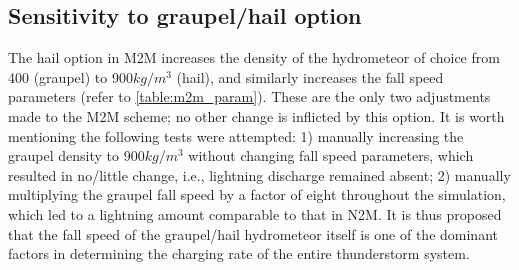\subsection{Sensitivity to graupel/hail option}
The hail option in M2M increases the density of the hydrometeor of choice from 400 (graupel) to 900$kg/m^3$ (hail), and similarly increases the fall speed parameters (refer to \ref{table:m2m_param}). These are the only two adjustments made to the M2M scheme; no other change is inflicted by this option. It is worth mentioning the following tests were attempted: 1) manually increasing the graupel density to 900$kg/m^3$ without changing fall speed parameters, which resulted in no/little change, i.e., lightning discharge remained absent; 2) manually multiplying the graupel fall speed by a factor of eight throughout the simulation, which led to a lightning amount comparable to that in N2M. It is thus proposed that the fall speed of the graupel/hail hydrometeor itself is one of the dominant factors in determining the charging rate of the entire thunderstorm system. 

